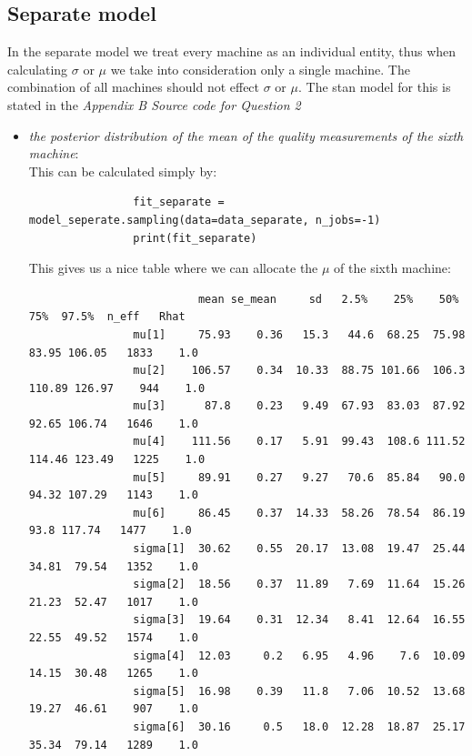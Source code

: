 \documentclass[11pt,a4paper,english]{article}
\begin{document}
        \subsection{Separate model}
          In the separate model we treat every machine as an individual entity, thus when calculating $\sigma$ or $\mu$ we take into consideration only a single machine. The combination of all machines should not effect $\sigma$ or $\mu$. The stan model for this is stated in the \textit{Appendix B  Source code for Question 2}

          \begin{itemize}
            \item \textit{the posterior distribution of the mean of the quality measurements of the sixth machine}: \\
              This can be calculated simply by:
              \begin{verbatim}
                fit_separate = model_seperate.sampling(data=data_separate, n_jobs=-1)
                print(fit_separate)
              \end{verbatim}
              This gives us a nice table where we can allocate the $\mu$ of the sixth machine:
              \begin{verbatim}
                          mean se_mean     sd   2.5%    25%    50%    75%  97.5%  n_eff   Rhat
                mu[1]     75.93    0.36   15.3   44.6  68.25  75.98  83.95 106.05   1833    1.0
                mu[2]    106.57    0.34  10.33  88.75 101.66  106.3 110.89 126.97    944    1.0
                mu[3]      87.8    0.23   9.49  67.93  83.03  87.92  92.65 106.74   1646    1.0
                mu[4]    111.56    0.17   5.91  99.43  108.6 111.52 114.46 123.49   1225    1.0
                mu[5]     89.91    0.27   9.27   70.6  85.84   90.0  94.32 107.29   1143    1.0
                mu[6]     86.45    0.37  14.33  58.26  78.54  86.19   93.8 117.74   1477    1.0
                sigma[1]  30.62    0.55  20.17  13.08  19.47  25.44  34.81  79.54   1352    1.0
                sigma[2]  18.56    0.37  11.89   7.69  11.64  15.26  21.23  52.47   1017    1.0
                sigma[3]  19.64    0.31  12.34   8.41  12.64  16.55  22.55  49.52   1574    1.0
                sigma[4]  12.03     0.2   6.95   4.96    7.6  10.09  14.15  30.48   1265    1.0
                sigma[5]  16.98    0.39   11.8   7.06  10.52  13.68  19.27  46.61    907    1.0
                sigma[6]  30.16     0.5   18.0  12.28  18.87  25.17  35.34  79.14   1289    1.0

\end{verbatim}
\end{itemize}
\end{document}
